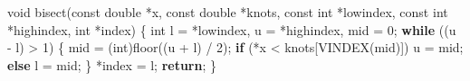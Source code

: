 \documentclass[
  12pt,
]{article}
\newenvironment{Shaded}{\begin{snugshade}}{\end{snugshade}}
\newcommand{\ControlFlowTok}[1]{\textcolor[rgb]{0.13,0.29,0.53}{\textbf{#1}}}
\newcommand{\DataTypeTok}[1]{\textcolor[rgb]{0.13,0.29,0.53}{#1}}
\newcommand{\DecValTok}[1]{\textcolor[rgb]{0.00,0.00,0.81}{#1}}
\newcommand{\NormalTok}[1]{#1}
\begin{document}
\begin{Shaded}
\begin{Highlighting}[]
\DataTypeTok{void}\NormalTok{ bisect(}\DataTypeTok{const} \DataTypeTok{double}\NormalTok{ *x, }\DataTypeTok{const} \DataTypeTok{double}\NormalTok{ *knots, }\DataTypeTok{const} \DataTypeTok{int}\NormalTok{ *lowindex,}
            \DataTypeTok{const} \DataTypeTok{int}\NormalTok{ *highindex, }\DataTypeTok{int}\NormalTok{ *index) \{}
    \DataTypeTok{int}\NormalTok{ l = *lowindex, u = *highindex, mid = }\DecValTok{0}\NormalTok{;}
    \ControlFlowTok{while}\NormalTok{ ((u {-} l) \textgreater{} }\DecValTok{1}\NormalTok{) \{}
\NormalTok{        mid = (}\DataTypeTok{int}\NormalTok{)floor((u + l) / }\DecValTok{2}\NormalTok{);}
        \ControlFlowTok{if}\NormalTok{ (*x \textless{} knots[VINDEX(mid)])}
\NormalTok{            u = mid;}
        \ControlFlowTok{else}
\NormalTok{            l = mid;}
\NormalTok{    \}}
\NormalTok{    *index = l;}
    \ControlFlowTok{return}\NormalTok{;}
\NormalTok{\}}


\end{Highlighting}
\end{Shaded}
\end{document}
